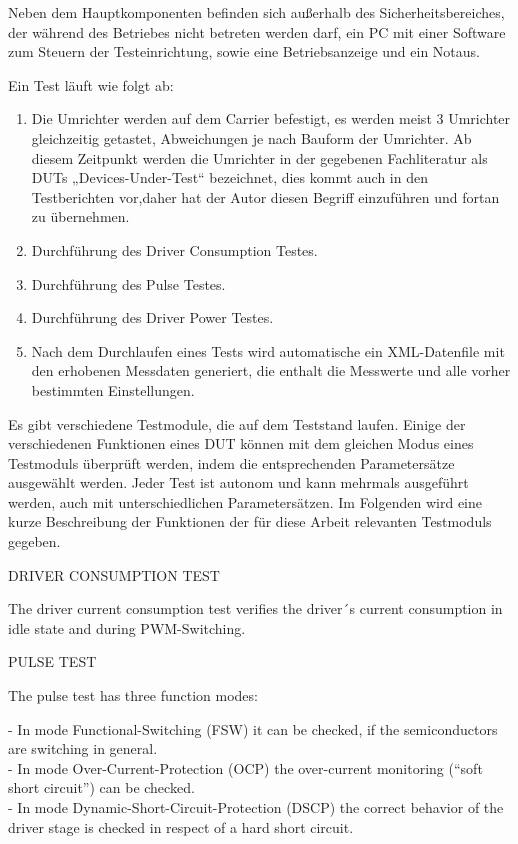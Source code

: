 Neben dem Hauptkomponenten befinden sich außerhalb des Sicherheitsbereiches, der während des Betriebes nicht betreten werden darf,
ein PC mit einer Software zum Steuern der Testeinrichtung, sowie eine Betriebsanzeige und ein Notaus.



Ein Test läuft wie folgt ab:

\begin{enumerate}
\item Die Umrichter werden auf dem Carrier befestigt, es werden meist 3 Umrichter gleichzeitig getastet, Abweichungen je nach Bauform der Umrichter.
Ab diesem Zeitpunkt werden die Umrichter in der gegebenen Fachliteratur als DUTs „Devices-Under-Test“ bezeichnet, dies kommt auch in den Testberichten vor,daher hat der Autor diesen Begriff einzuführen und fortan zu übernehmen.


\item Durchführung des Driver Consumption Testes.


\item Durchführung des Pulse Testes.


\item Durchführung des Driver Power Testes.


\item Nach dem Durchlaufen eines Tests wird automatische ein XML-Datenfile mit den erhobenen Messdaten generiert, die enthalt die Messwerte und alle vorher bestimmten Einstellungen.


\end{enumerate}
Es gibt verschiedene Testmodule, die auf dem Teststand laufen. Einige der verschiedenen Funktionen eines DUT können mit dem gleichen Modus eines Testmoduls überprüft werden, indem die entsprechenden Parametersätze ausgewählt werden. Jeder Test ist autonom und kann mehrmals ausgeführt werden, auch mit unterschiedlichen Parametersätzen. Im Folgenden wird eine kurze Beschreibung der Funktionen der für diese Arbeit relevanten Testmoduls gegeben.

DRIVER CONSUMPTION TEST

The driver current consumption test verifies the driver´s current consumption in idle state and during PWM-Switching.

PULSE TEST

The pulse test has three function modes:

- In mode Functional-Switching (FSW) it can be checked, if the semiconductors are switching in general. \\
- In mode Over-Current-Protection (OCP) the over-current monitoring (“soft short circuit”) can be checked.\\
- In mode Dynamic-Short-Circuit-Protection (DSCP) the correct behavior of the driver stage is checked in respect of a hard short circuit.

